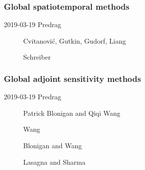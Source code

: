 \subsubsection{Global spatiotemporal methods}
\begin{description}

\item[2019-03-19 Predrag]

Cvitanovi\'c, Gutkin, Gudorf, Liang

Schreiber

\end{description}

\subsubsection{Global adjoint sensitivity methods}
\begin{description}

\item[2019-03-19 Predrag]

{Patrick Blonigan}
and
{Qiqi Wang}

Wang

Blonigan and Wang

Lasagna and Sharma



\end{description}

\printbibliography[heading=subbibintoc,title={References}]
